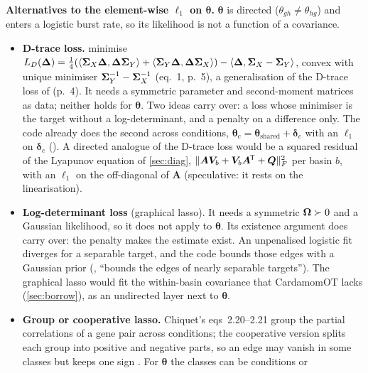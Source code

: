\documentclass[11pt,a4paper]{article}
\begin{document}
\textbf{Alternatives to the element-wise $\ell_1$ on $\bm\theta$.} $\bm\theta$ is directed
($\theta_{gh}\neq\theta_{hg}$) and enters a logistic burst rate, so its likelihood is not a function of a
covariance.
\begin{itemize}
  \item \textbf{D-trace loss.} \textcite{yuanDifferentialNetworkAnalysis2017} minimise
        $L_D(\bm\Delta)=\tfrac14(\langle\bm{\Sigma}_X\bm\Delta,\bm\Delta\bm{\Sigma}_Y\rangle+\langle\bm{\Sigma}_Y\bm\Delta,
        \bm\Delta\bm{\Sigma}_X\rangle)-\langle\bm\Delta,\bm{\Sigma}_X-\bm{\Sigma}_Y\rangle$, convex with unique minimiser
        $\bm{\Sigma}_Y^{-1}-\bm{\Sigma}_X^{-1}$ (eq.~1, p.~5), a generalisation of the D-trace loss of
        \textcite{zhangSparsePrecisionMatrix2014} (p.~4). It needs a symmetric parameter and second-moment
        matrices as data; neither holds for $\bm\theta$. Two ideas carry over: a loss whose minimiser is the
        target without a log-determinant, and a penalty on a difference only. The code already does the
        second across conditions, $\bm\theta_c=\bm\theta_{\mathrm{shared}}+\bm\delta_c$ with an $\ell_1$ on
        $\bm\delta_c$ (). A directed analogue of the D-trace loss would be a
        squared residual of the Lyapunov equation of \cref{sec:diag}, $\lVert\bm A\bm V_b+\bm V_b\bm A^{\mkern-1.5mu\mathsf{T}}+\bm
        Q\rVert_F^2$ per basin $b$, with an $\ell_1$ on the off-diagonal of $\bm A$ (speculative: it rests on
        the linearisation).
  \item \textbf{Log-determinant loss} (graphical lasso). It needs a symmetric $\bm{\Omega}\succ0$ and a Gaussian
        likelihood, so it does not apply to $\bm\theta$. Its existence argument does carry over: the
        penalty makes the estimate exist. An unpenalised logistic fit diverges for a separable target, and
        the code bounds those edges with a Gaussian prior (, \enquote{bounds the
        edges of nearly separable targets}). The graphical lasso would fit the within-basin covariance that
        CardamomOT lacks (\cref{sec:borrow}), as an undirected layer next to $\bm\theta$.
  \item \textbf{Group or cooperative lasso.} Chiquet's eqs~2.20--2.21 group the partial correlations of a
        gene pair across conditions; the cooperative version splits each group into positive and negative
        parts, so an edge may vanish in some classes but keeps one sign
        \parencite[p.~51]{chiquetContributionsSparseMethods2015}
        \parencite{chiquetSparsitySigncoherentGroups2012}. For $\bm\theta$ the classes can be conditions or

\end{itemize}
\end{document}
